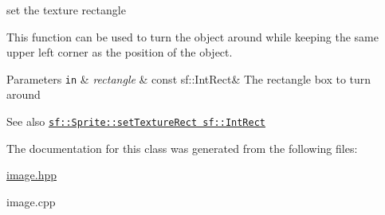 set the texture rectangle 

This function can be used to turn the object around while keeping the same upper left corner as the position of the object.


\begin{DoxyParams}[1]{Parameters}
\mbox{\tt in}  & {\em rectangle} & const sf\+::\+Int\+Rect\& The rectangle box to turn around \\
\hline
\end{DoxyParams}
\begin{DoxySeeAlso}{See also}
\href{https://www.sfml-dev.org/documentation/2.0/classsf_1_1Sprite.php#a3fefec419a4e6a90c0fd54c793d82ec2 }{\tt sf\+::\+Sprite\+::set\+Texture\+Rect sf\+::\+Int\+Rect} 
\end{DoxySeeAlso}


The documentation for this class was generated from the following files\+:\begin{DoxyCompactItemize}
\item 
\hyperlink{image_8hpp}{image.\+hpp}\item 
image.\+cpp\end{DoxyCompactItemize}
